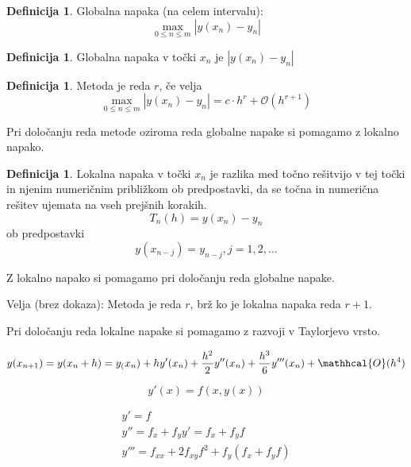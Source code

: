 \documentclass[a4paper,12pt]{article}
\theoremstyle{definition}
\newtheorem{defn}[counter]{Definicija}
\theoremstyle{remark}
\begin{document}
\begin{defn}
    Globalna napaka (na celem intervalu):
    \begin{equation*}
        \max_{0 \leq n \leq m} |y(x_n) - y_n|
    \end{equation*}
\end{defn}

\begin{defn}
    Globalna napaka v točki $x_n$ je $|y(x_n) - y_n|$
\end{defn}

\begin{defn}
    Metoda je reda $r$, če velja
    \begin{equation*}
        \max_{0 \leq n \leq m} |y(x_n) - y_n| = c \cdot h^r + \mathcal{O} (h^{r+1})
    \end{equation*}
\end{defn}

Pri določanju reda metode oziroma reda globalne napake si pomagamo z lokalno napako.

\begin{defn}
    Lokalna napaka v točki $x_n$ je razlika med točno rešitvijo v tej točki in njenim numeričnim približkom ob predpostavki,
    da se točna in numerična rešitev ujemata na vseh prejšnih korakih.
    \begin{equation*}
        T_n(h) = y(x_n) - y_n
    \end{equation*}
    ob predpostavki
    \begin{equation*}
        y(x_{n-j}) = y_{n-j}, j=1, 2, \dots
    \end{equation*}
\end{defn}

Z lokalno napako si pomagamo pri določanju reda globalne napake.

Velja (brez dokaza): Metoda je reda $r$, brž ko je lokalna napaka reda $r+1$.

Pri določanju reda lokalne napake si pomagamo z razvoji v Taylorjevo vrsto.

\begin{equation*}
    y(x_{n+1}) = y(x_n + h) = y_(x_n) + h y'(x_n) + \frac{h^2}{2} y''(x_n) + \frac{h^3}{6} y'''(x_n) + \mathhcal{O}(h^4)
\end{equation*}

\begin{equation*}
    y'(x) = f(x, y(x))
\end{equation*}

\begin{gather*}
    y' = f \\
    y'' = f_x + f_y y' = f_x + f_yf \\
    y''' = f_{xx} + 2 f_{xy} f^2 + f_y(f_x + f_y f)
\end{gather*}
\end{document}
